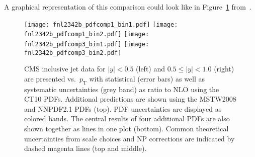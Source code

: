 \documentclass[12pt,a4paper,twoside]{article}
\begin{document}
A graphical representation of this comparison could look like in
Figure~\ref{fig:InclJetsBins12} from~\cite{CMS-NOTE-2011-004}.

\begin{figure}[p]
  \texttt{[image: fnl2342b\_pdfcomp1\_bin1.pdf]}\hftwo%
  \texttt{[image: fnl2342b\_pdfcomp1\_bin2.pdf]}
  \texttt{[image: fnl2342b\_pdfcomp3\_bin1.pdf]}\hftwo%
  \texttt{[image: fnl2342b\_pdfcomp3\_bin2.pdf]}
  \caption{CMS inclusive jet data for $|y| < 0.5$ (left) and $0.5 \leq
    |y| < 1.0$ (right) are presented vs.\ $p_{\mathrm{T}}$ with
    statistical (error bars) as well as systematic uncertainties (grey
    band) as ratio to NLO using the CT10 PDFs. Additional predictions
    are shown using the MSTW2008 and NNPDF2.1 PDFs (top). PDF
    uncertainties are displayed as colored bands. The central results
    of four additional PDFs are also shown together as lines in one
    plot (bottom).  Common theoretical uncertainties from scale
    choices and NP corrections are indicated by dashed magenta lines
    (top and middle).}
  \label{fig:InclJetsBins12}
\end{figure}


\clearpage  %

\end{document}
